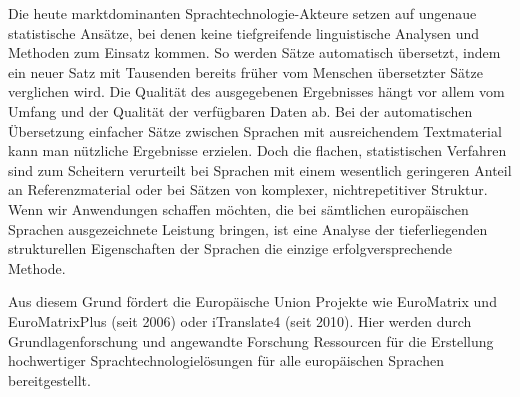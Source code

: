 \documentclass[]{../../metanetpaper}
\begin{document}
\begin{Parallel}[c]{79mm}{78mm}
{Die heute marktdominanten Sprach\-tech\-no\-logie-Ak\-teu\-re setzen auf ungenaue statistische Ansätze, bei denen keine tiefgreifende linguistische Analysen und Methoden zum Einsatz kommen. So werden Sätze automatisch übersetzt, indem ein neuer Satz mit Tausenden bereits früher vom Menschen übersetzter Sätze verglichen wird. Die Qualität des ausgegebenen Ergebnisses hängt vor allem vom Umfang und der Qualität der verfügbaren Daten ab. Bei der automatischen Übersetzung einfacher Sätze zwischen Sprachen mit ausreichendem Textmaterial kann man nützliche Ergebnisse erzielen. Doch die flachen, statistischen Verfahren sind zum Scheitern verurteilt bei Sprachen mit einem wesentlich geringeren Anteil an Referenzmaterial oder bei Sätzen von komplexer, nichtrepetitiver Struktur. Wenn wir Anwendungen schaffen möchten, die bei sämtlichen europäischen Sprachen ausgezeichnete Leistung bringen, ist eine Analyse der tieferliegenden strukturellen Eigenschaften der Sprachen die einzige erfolgversprechende Methode.

Aus diesem Grund fördert die Europäische Union Projekte wie EuroMatrix und EuroMatrixPlus (seit 2006) oder iTranslate4 (seit 2010). Hier werden durch Grundlagenforschung und angewandte Forschung Ressourcen für die Erstellung hochwertiger Sprachtechnologielösungen für alle europäischen Sprachen bereitgestellt. 

}
\end{Parallel}
\end{document}
